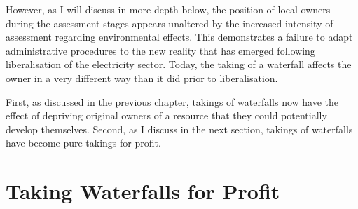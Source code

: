 However, as I will discuss in more depth below, the position of local owners during the assessment stages appears unaltered by the increased intensity of assessment regarding environmental effects. This demonstrates a failure to adapt administrative procedures to the new reality that has emerged following liberalisation of the electricity sector. Today, the taking of a waterfall affects the owner in a very different way than it did prior to liberalisation.

First, as discussed in the previous chapter, takings of waterfalls now have the effect of depriving original owners of a resource that they could potentially develop themselves. Second, as I discuss in the next section, takings of waterfalls have become pure takings for profit.

\section{Taking Waterfalls for Profit}\label{sec:twpp}
